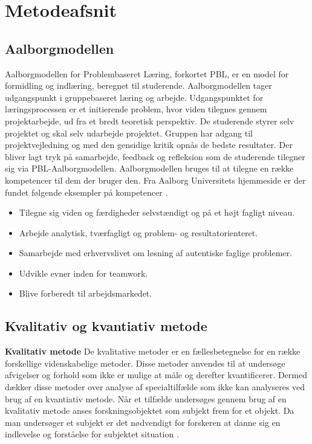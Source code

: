 \chapter{Metodeafsnit}
\section{Aalborgmodellen}
Aalborgmodellen for Problembaseret Læring, forkortet PBL, er en model for formidling og indlæring, beregnet til studerende. Aalborgmodellen tager udgangspunkt i gruppebaseret læring og arbejde. Udgangspunktet for læringsprocessen er et initierende problem, hvor viden tilegnes gennem projektarbejde, ud fra et bredt teoretisk perspektiv. De studerende styrer selv projektet og skal selv udarbejde projektet. Gruppen har adgang til projektvejledning og med den gensidige kritik opnås de bedste resultater. Der bliver lagt tryk på samarbejde, feedback og refleksion som de studerende tilegner sig via PBL-Aalborgmodellen.
Aalborgmodellen bruges til at tilegne en række kompetencer til dem der bruger den. Fra Aalborg Universitets hjemmeside er der fundet følgende eksempler på kompetencer \citep{Universitet2015}\citep{Universitet2011}.
\begin{itemize}
\setlength\itemsep{0.5em}
\item {Tilegne sig viden og færdigheder selvstændigt og på et højt fagligt niveau.}
\item {Arbejde analytisk, tværfagligt og problem- og resultatorienteret.}
\item {Samarbejde med erhvervslivet om løsning af autentiske faglige problemer.}
\item {Udvikle evner inden for teamwork.}
\item {Blive forberedt til arbejdsmarkedet.}
\end{itemize}

\section{Kvalitativ og kvantiativ metode}
\textbf{Kvalitativ metode}
De kvalitative metoder er en fællesbetegnelse for en række forskellige videnskabelige metoder. Disse metoder anvendes til at undersøge afvigelser og forhold som ikke er mulige at måle og derefter kvantificerer. Dermed dækker disse metoder over analyse af specialtilfælde som ikke kan analyseres ved brug af en kvantiativ metode. Når et tilfælde undersøges gennem brug af en kvalitativ metode anses forskningsobjektet som subjekt frem for et objekt. Da man undersøger et subjekt er det nødvendigt for forskeren at danne sig en indlevelse og forståelse for subjektet situation \citep{Kval}.

